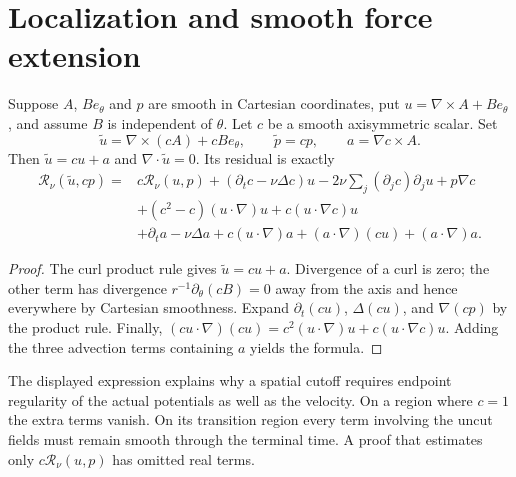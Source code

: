 \section{Localization and smooth force extension}

\begin{proposition}
\label{prop:ns-potential-localization}
Suppose $A$, $B e_\theta$ and $p$ are smooth in Cartesian coordinates,
put $u=\nabla\times A+B e_\theta$, and assume $B$ is independent of $\theta$.
Let $c$ be a smooth axisymmetric scalar.
Set
\[
 \widetilde u=\nabla\times(cA)+cBe_\theta,
 \qquad \widetilde p=cp,\qquad a=\nabla c\times A.
\]
Then $\widetilde u=cu+a$ and $\nabla\cdot\widetilde u=0$.
Its residual is exactly
\begin{align*}
 \mathcal R_\nu(\widetilde u,cp)
 ={}&c\mathcal R_\nu(u,p)
   +(\partial_tc-\nu\Delta c)u-2\nu\sum_j(\partial_jc)\partial_ju
       +p\nabla c\\
 &+(c^2-c)(u\cdot\nabla)u+c(u\cdot\nabla c)u\\
 &+\partial_ta-\nu\Delta a+c(u\cdot\nabla)a
      +(a\cdot\nabla)(cu)+(a\cdot\nabla)a.
\end{align*}
\end{proposition}
\begin{proof}
The curl product rule gives $\widetilde u=cu+a$. Divergence of a curl
is zero; the other term has divergence $r^{-1}\partial_\theta(cB)=0$
away from the axis and hence everywhere by Cartesian smoothness.
Expand $\partial_t(cu)$, $\Delta(cu)$, and $\nabla(cp)$ by the product
rule. Finally,
$(cu\cdot\nabla)(cu)=c^2(u\cdot\nabla)u+c(u\cdot\nabla c)u$.
Adding the three advection terms containing $a$ yields the formula.
\end{proof}

The displayed expression explains why a spatial cutoff requires endpoint
regularity of the actual potentials as well as the velocity. On a region
where $c=1$ the extra terms vanish. On its transition region every term
involving the uncut fields must remain smooth through the terminal time.
A proof that estimates only $c\mathcal R_\nu(u,p)$ has omitted real terms.

